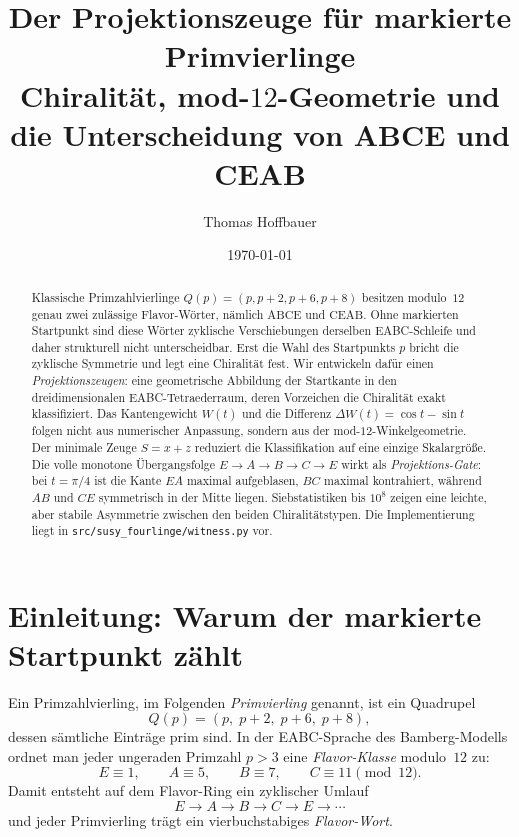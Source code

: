 \documentclass[11pt,a4paper]{article}
\title{Der Projektionszeuge für markierte Primvierlinge\\
	\large Chiralität, mod-$12$-Geometrie und die Unterscheidung von ABCE und CEAB}
\author{Thomas Hoffbauer}
\date{\today}
\theoremstyle{definition}
\theoremstyle{plain}
\begin{document}
	\maketitle
	
	\begin{abstract}
		Klassische Primzahlvierlinge $Q(p)=(p,p+2,p+6,p+8)$ besitzen modulo~$12$ genau zwei zulässige Flavor-Wörter, nämlich $\mathrm{ABCE}$ und $\mathrm{CEAB}$. Ohne markierten Startpunkt sind diese Wörter zyklische Verschiebungen derselben EABC-Schleife und daher strukturell nicht unterscheidbar. Erst die Wahl des Startpunkts $p$ bricht die zyklische Symmetrie und legt eine Chiralität fest. Wir entwickeln dafür einen \emph{Projektionszeugen}: eine geometrische Abbildung der Startkante in den dreidimensionalen EABC-Tetraederraum, deren Vorzeichen die Chiralität exakt klassifiziert. Das Kantengewicht $W(t)$ und die Differenz $\Delta W(t)=\cos t-\sin t$ folgen nicht aus numerischer Anpassung, sondern aus der mod-$12$-Winkelgeometrie. Der minimale Zeuge $S=x+z$ reduziert die Klassifikation auf eine einzige Skalargröße. Die volle monotone Übergangsfolge $E\!\to\!A\!\to\!B\!\to\!C\!\to\!E$ wirkt als \emph{Projektions-Gate}: bei $t=\pi/4$ ist die Kante $EA$ maximal aufgeblasen, $BC$ maximal kontrahiert, während $AB$ und $CE$ symmetrisch in der Mitte liegen. Siebstatistiken bis $10^8$ zeigen eine leichte, aber stabile Asymmetrie zwischen den beiden Chiralitätstypen. Die Implementierung liegt in \texttt{src/susy\_fourlinge/witness.py} vor.
	\end{abstract}
	
	\tableofcontents
	
	\section{Einleitung: Warum der markierte Startpunkt zählt}
	
	Ein Primzahlvierling, im Folgenden \emph{Primvierling} genannt, ist ein Quadrupel
	\[
	Q(p)=(p,\;p+2,\;p+6,\;p+8),
	\]
	dessen sämtliche Einträge prim sind. In der EABC-Sprache des Bamberg-Modells ordnet man jeder ungeraden Primzahl $p>3$ eine \emph{Flavor-Klasse} modulo~$12$ zu:
	\[
	E\equiv 1,\qquad A\equiv 5,\qquad B\equiv 7,\qquad C\equiv 11 \pmod{12}.
	\]
	Damit entsteht auf dem Flavor-Ring ein zyklischer Umlauf
	\[
	E \to A \to B \to C \to E \to \cdots
	\]
	und jeder Primvierling trägt ein vierbuchstabiges \emph{Flavor-Wort}.
	
\end{document}
